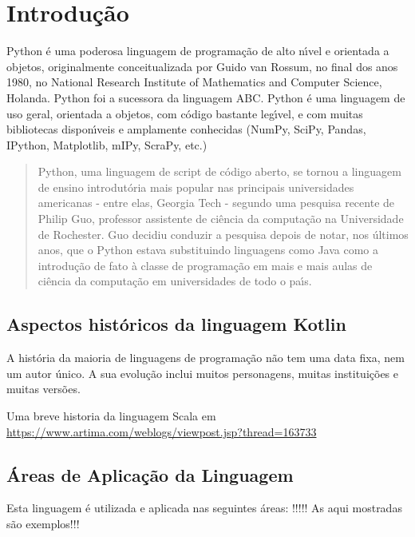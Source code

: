 

\chapter{ Introdu\c{c}\~{a}o}

Python \'{e} uma poderosa linguagem de programa\c{c}\~{a}o de alto n\'{\i}vel e orientada a objetos, originalmente conceitualizada por Guido van Rossum, no final dos anos 1980, no National Research Institute of Mathematics and Computer Science, Holanda. Python foi a sucessora da linguagem ABC. Python \'{e} uma linguagem  de uso geral, orientada a objetos, com c\'{o}digo bastante leg\'{\i}vel, e com muitas bibliotecas dispon\'{\i}veis e amplamente conhecidas (NumPy, SciPy, Pandas, IPython, Matplotlib, mIPy, ScraPy, etc.)
\begin{quote}
  Python, uma linguagem de script de c\'{o}digo aberto, se tornou a linguagem de ensino introdut\'{o}ria mais popular nas principais universidades americanas - entre elas, Georgia Tech - segundo uma pesquisa recente de Philip Guo, professor assistente de ci\^{e}ncia da computa\c{c}\~{a}o na Universidade de Rochester. Guo decidiu conduzir a pesquisa depois de notar, nos \'{u}ltimos anos, que o Python estava substituindo linguagens como Java como a introdu\c{c}\~{a}o de fato \`{a} classe de programa\c{c}\~{a}o em mais e mais aulas de ci\^{e}ncia da computa\c{c}\~{a}o em universidades de todo o pa\'{\i}s. \cite{Shein2015}
\end{quote}


   \section{Aspectos hist\'{o}ricos da linguagem Kotlin}

A hist\'{o}ria da maioria de linguagens de programa\c{c}\~{a}o n\~{a}o tem uma data fixa, nem um autor \'{u}nico. A sua evolu\c{c}\~{a}o inclui muitos personagens, muitas institui\c{c}\~{o}es e muitas vers\~{o}es.

Uma breve historia da linguagem Scala em \url{https://www.artima.com/weblogs/viewpost.jsp?thread=163733}


   \section{\'{A}reas de Aplica\c{c}\~{a}o da Linguagem}
   Esta linguagem \'{e} utilizada e aplicada nas seguintes \'{a}reas: !!!!! As aqui mostradas s\~{a}o exemplos!!!

